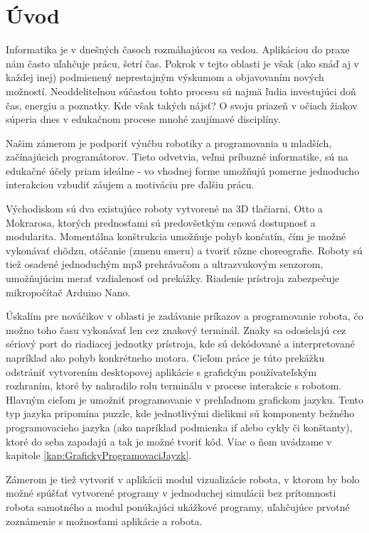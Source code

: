 
\chapter*{Úvod} %

Informatika je v dnešných časoch rozmáhajúcou sa vedou. Aplikáciou do praxe nám často uľahčuje prácu, šetrí čas. Pokrok v tejto oblasti je však (ako snáď aj v každej inej) podmienený neprestajným výskumom a objavovaním nových možností. Neoddeliteľnou súčasťou tohto procesu sú najmä ľudia investujúci doň čas, energiu a poznatky. Kde však takých nájsť? O svoju priazeň v očiach žiakov súperia dnes v edukačnom procese mnohé zaujímavé disciplíny.

Našim zámerom je podporiť výučbu robotiky a programovania u mladších, začínajúcich programátorov. Tieto odvetvia, veľmi príbuzné informatike, sú na edukačné  účely priam ideálne - vo vhodnej forme umožňujú pomerne jednoducho interakciou vzbudiť záujem a motiváciu pre ďalšiu prácu.

Východiskom sú dva existujúce roboty vytvorené na 3D tlačiarni, Otto a Mokrarosa, ktorých prednosťami sú predovšetkým cenová dostupnosť a modularita. Momentálna konštrukcia umožňuje pohyb končatín, čím je možné vykonávať chôdzu, otáčanie (zmenu smeru) a tvoriť rôzne choreografie. Roboty sú tiež osadené jednoduchým mp3 prehrávačom a ultrazvukovým senzorom, umožňujúcim merať vzdialenosť od prekážky. Riadenie prístroja zabezpečuje mikropočítač Arduino Nano.

Úskalím pre nováčikov v oblasti je zadávanie príkazov a programovanie robota, čo možno toho času vykonávať len cez znakový terminál. Znaky sa odosielajú cez sériový port do riadiacej jednotky prístroja, kde sú dekódované a interpretované napríklad ako pohyb konkrétneho motora. Cieľom práce je túto prekážku odstrániť vytvorením desktopovej aplikácie s grafickým používateľským rozhraním, ktoré by nahradilo rolu terminálu v procese interakcie s robotom. Hlavným cieľom je umožniť programovanie v prehľadnom grafickom jazyku. Tento typ jazyka pripomína puzzle, kde jednotlivými dielikmi sú komponenty bežného programovacieho jazyka (ako napríklad podmienka if alebo cykly či konštanty), ktoré do seba zapadajú a tak je možné tvoriť kód. Viac o ňom uvádzame v kapitole \ref{kap:GrafickyProgramovaciJayzk}.
 
Zámerom je tiež vytvoriť v aplikácii modul vizualizácie robota, v ktorom by bolo možné spúšťať vytvorené programy v jednoduchej simulácii bez prítomnosti robota samotného a modul ponúkajúci ukážkové programy, uľahčujúce prvotné zoznámenie s možnosťami aplikácie a robota.
